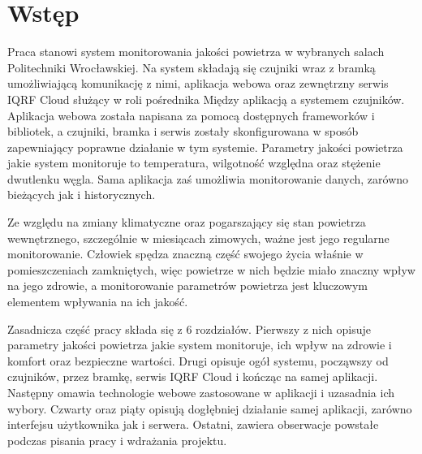 \section{Wstęp}

Praca stanowi system monitorowania jakości powietrza w wybranych salach Politechniki Wrocławskiej. Na system składają się
czujniki wraz z bramką umożliwiającą komunikację z nimi, aplikacja webowa oraz zewnętrzny serwis IQRF Cloud służący w roli pośrednika
Między aplikacją a systemem czujników.
Aplikacja webowa została napisana za pomocą dostępnych frameworków i bibliotek, a czujniki, bramka i serwis zostały skonfigurowana
w sposób zapewniający poprawne działanie w tym systemie. Parametry jakości powietrza jakie system monitoruje 
to temperatura, wilgotność względna oraz stężenie dwutlenku węgla. Sama aplikacja zaś umożliwia monitorowanie danych, zarówno 
bieżących jak i historycznych.

Ze względu na zmiany klimatyczne oraz pogarszający się stan powietrza wewnętrznego, szczególnie w miesiącach zimowych, ważne jest jego 
regularne monitorowanie. Człowiek spędza znaczną część swojego życia właśnie w pomieszczeniach zamkniętych, więc powietrze w nich
będzie miało znaczny wpływ na jego zdrowie, a monitorowanie parametrów powietrza jest kluczowym elementem wpływania na ich jakość.

Zasadnicza część pracy składa się z 6 rozdziałów. Pierwszy z nich opisuje parametry jakości powietrza jakie system monitoruje, ich wpływ 
na zdrowie i komfort oraz bezpieczne wartości. Drugi opisuje ogół systemu, począwszy od czujników, przez bramkę, serwis IQRF Cloud i kończąc
na samej aplikacji. Następny omawia technologie webowe zastosowane w aplikacji i uzasadnia ich wybory. Czwarty oraz piąty opisują dogłębniej działanie
samej aplikacji, zarówno interfejsu użytkownika jak i serwera. Ostatni, zawiera obserwacje powstałe podczas pisania pracy i wdrażania projektu.





